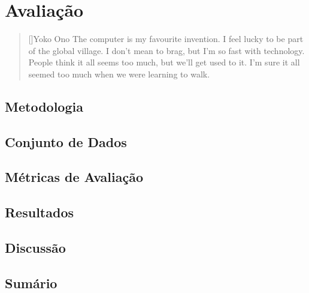 \chapter{Avaliação}
\label{cap:evaluation}

\begin{quotation}[]{Yoko Ono}
The computer is my favourite invention. I feel lucky to be part of the global village. I don't mean to brag, but I'm so fast with technology. People think it all seems too much, but we'll get used to it. I'm sure it all seemed too much when we were learning to walk.
\end{quotation}

\section{Metodologia}
\section{Conjunto de Dados}
\section{Métricas de Avaliação}
\section{Resultados}
\section{Discussão}
\section{Sumário}